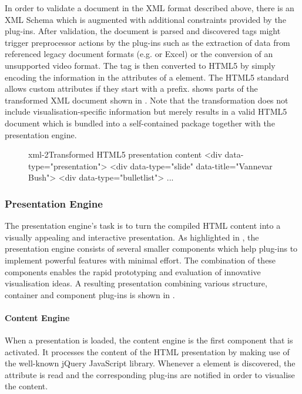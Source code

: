      In order to validate a \mxp document in the XML format described above,
     there is an XML Schema which is augmented with additional constraints
     provided by the plug-ins. After validation, the document is parsed and
     discovered tags might trigger preprocessor actions by the plug-ins such as
     the extraction of data from referenced legacy document formats (e.g.  \ppt
     or Excel) or the conversion of an unsupported video format. The tag is
     then converted to HTML5 by simply encoding the information in the
     attributes of a  element. The HTML5 standard allows custom
     attributes if they start with a  prefix.  shows
     parts of the transformed XML document shown in . Note that
     the transformation does not include visualisation-specific information but
     merely results in a valid HTML5 document which is bundled into a
     self-contained package together with the presentation engine.

     \begin{figure}[h!]
      \begin{lstxml}{xml-2}{Transformed HTML5 presentation content}
<div data-type="presentation">
  <div data-type="slide" data-title="Vannevar Bush">
    <div data-type="bulletlist">
      ...
      \end{lstxml}
     \end{figure}

    \subsubsection{Presentation Engine}

     The presentation engine's task is to turn the compiled HTML content into a
     visually appealing and interactive presentation. As highlighted in
     , the presentation engine consists of several
     smaller components which help plug-ins to implement powerful features with
     minimal effort. The combination of these components enables the rapid
     prototyping and evaluation of innovative visualisation ideas. A resulting
     \mxp presentation combining various structure, container and component
     plug-ins is shown in .


     \paragraph{Content Engine} When a presentation is loaded, the content
      engine is the first component that is activated. It processes the content
      of the HTML presentation by making use of the well-known jQuery
      JavaScript library. Whenever a  element is discovered, the
       attribute is read and the corresponding plug-ins are
      notified in order to visualise the content.

